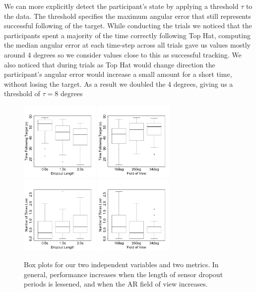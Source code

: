 \documentclass{acmsiggraph}                     %
\begin{document}

We can more explicitly detect the participant's state by applying a threshold $\tau$ to the data.  The threshold specifies the maximum angular error that still represents successful following of the target. 
While conducting the trials we noticed that the participants spent a majority of the time correctly following Top Hat, computing the median angular error at each time-step across all trials gave us values mostly around 4 degrees so we consider values close to this as successful tracking.  We also noticed that during trials as Top Hat would change direction the participant's angular error would increase a small amount for a short time, without losing the target.  As a result we doubled the 4 degrees, giving us a threshold of $\tau = 8$ degrees
\begin{figure}[t]
	\centering
	\includegraphics[width=1.5in]{figures/tt_deadlen.pdf}
	\includegraphics[width=1.5in]{figures/tt_fov.pdf}\\
	\includegraphics[width=1.5in]{figures/numtimes_deadlen.pdf}
	\includegraphics[width=1.5in]{figures/numtimes_fov.pdf}
	\caption{\label{fig:tt_deadlen}Box plots for our two independent variables and two metrics.  In general, performance increases when the length of sensor dropout periods is lessened, and when the AR field of view increases.}
\end{figure}
\end{document}
